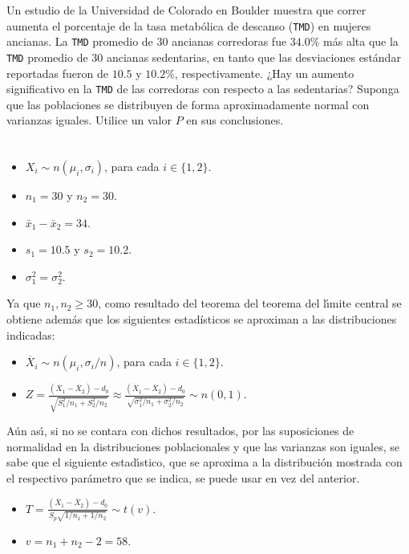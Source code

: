 \begin{enunciado}
 Un estudio de la Universidad de Colorado en Boulder muestra que correr aumenta el porcentaje de la tasa metab\'olica de descanso (\texttt{TMD}) en mujeres ancianas. La \texttt{TMD} promedio de $30$ ancianas corredoras fue $34.0\%$ m\'as alta que la \texttt{TMD} promedio de $30$ ancianas sedentarias, en tanto que las desviaciones est\'andar reportadas fueron de $10.5$ y $10.2\%$, respectivamente. ¿Hay un aumento significativo en la \texttt{TMD} de las corredoras con respecto a las sedentarias? Suponga que las poblaciones se distribuyen de forma aproximadamente normal con varianzas iguales. Utilice un valor $P$ en sus conclusiones.
\end{enunciado}

\begin{solucion}
 \begin{datos}
  $\phantom{0}$
  \begin{itemize}
   \item $X_i \sim n\left( \mu_i, \sigma_i \right)$, para cada $i \in \{ 1, 2 \}$.
   \item $n_1 = 30$ y $n_2 = 30$.
   \item $\bar{x}_1 - \bar{x}_2 = 34$.
   \item $s_1 = 10.5$ y $s_2 = 10.2$.
   \item $\sigma_1^2 = \sigma_2^2$.
  \end{itemize}
  Ya que $n_1, n_2 \geq 30$,
  como resultado del teorema del teorema del l\'{\i}mite central
  se obtiene adem\'as que los siguientes estadísticos se aproximan
  a las distribuciones indicadas:
  \begin{itemize}
   \item $\overline{X}_i \sim n\left( \mu_i, \sigma_i/n \right)$,
   para cada $i \in \{ 1, 2 \}$.
   \item $Z = \frac{\left( \overline{X}_1 - \overline{X}_2 \right) - d_0}{\sqrt{S_1^2/n_1 + S_2^2/n_2}} \approx
   \frac{\left( \overline{X}_1 - \overline{X}_2 \right) - d_0}{\sqrt{\sigma_1^2/n_1 + \sigma_2^2/n_2}}
   \sim n\left( 0, 1 \right)$.
  \end{itemize}
  A\'un as\'{\i}, si no se contara con dichos resultados,
  por las suposiciones de normalidad en la distribuciones
  poblacionales y que las varianzas son iguales, se sabe
  que el siguiente estad\'{\i}stico,
  que se aproxima a la distribuci\'on mostrada
  con el respectivo par\'ametro que se indica,
  se puede usar en vez del anterior.
  \begin{itemize}
   \item $T = 
   \frac{\left( \overline{X}_1 - \overline{X}_2 \right) - d_0}{S_p\sqrt{1/n_1 + 1/n_2}} \sim t(v)$.
   \item $v = n_1 + n_2 - 2 = 58$.
  \end{itemize}
 \end{datos}


\end{solucion}
